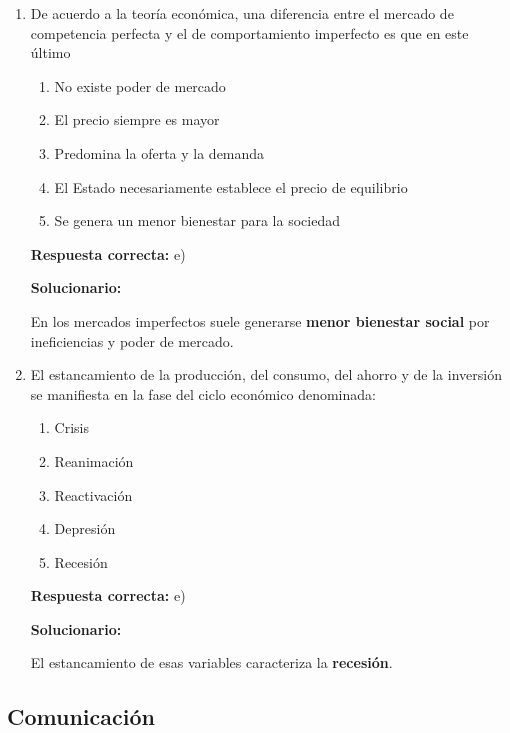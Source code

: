 \begin{enumerate}[resume]
	\vspace{6mm}
	
	\item De acuerdo a la teoría económica, una diferencia entre el mercado de competencia perfecta y el de comportamiento imperfecto es que en este último
	\begin{enumerate}[label=\alph*)]
		\item No existe poder de mercado
		\item El precio siempre es mayor
		\item Predomina la oferta y la demanda
		\item El Estado necesariamente establece el precio de equilibrio
		\item Se genera un menor bienestar para la sociedad
	\end{enumerate}
	\textbf{Respuesta correcta:} e)
	
	\vspace{2mm}
	\textbf{Solucionario:}
	
	En los mercados imperfectos suele generarse \textbf{menor bienestar social} por ineficiencias y poder de mercado.
	
	\vspace{6mm}
	
	\item El estancamiento de la producción, del consumo, del ahorro y de la inversión se manifiesta en la fase del ciclo económico denominada:
	\begin{enumerate}[label=\alph*)]
		\item Crisis
		\item Reanimación
		\item Reactivación
		\item Depresión
		\item Recesión
	\end{enumerate}
	\textbf{Respuesta correcta:} e)
	
	\vspace{2mm}
	\textbf{Solucionario:}
	
	El estancamiento de esas variables caracteriza la \textbf{recesión}.
	
	\vspace{6mm}
	
\end{enumerate}

\subsection*{Comunicación}

